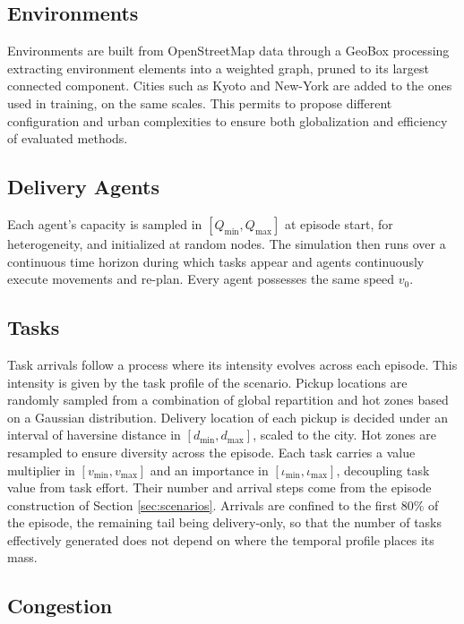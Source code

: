 \documentclass[sigconf]{acmart}
\begin{document}
\subsection{Environments}

Environments are built from OpenStreetMap data through a GeoBox processing extracting environment elements into a weighted graph, pruned to its largest connected component. Cities such as Kyoto and New-York are added to the ones used in training, on the same scales. This permits to propose different configuration and urban complexities to ensure both globalization and efficiency of evaluated methods.

\subsection{Delivery Agents}

Each agent's capacity is sampled in $[Q_{\min}, Q_{\max}]$ at episode start, for heterogeneity, and initialized at random nodes. The simulation then runs over a continuous time horizon during which tasks appear and agents continuously execute movements and re-plan. Every agent possesses the same speed $v_0$.

\subsection{Tasks}

Task arrivals follow a process where its intensity evolves across each episode. This intensity is given by the task profile of the scenario. Pickup locations are randomly sampled from a combination of global repartition and hot zones based on a Gaussian distribution. Delivery location of each pickup is decided under an interval of haversine distance in $[d_{\min}, d_{\max}]$, scaled to the city. Hot zones are resampled to ensure diversity across the episode. Each task carries a value multiplier in $[v_{\min}, v_{\max}]$ and an importance in $[\iota_{\min}, \iota_{\max}]$, decoupling task value from task effort. Their number and arrival steps come from the episode construction of Section \ref{sec:scenarios}. Arrivals are confined to the first $80\%$ of the episode, the remaining tail being delivery-only, so that the number of tasks effectively generated does not depend on where the temporal profile places its mass.

\subsection{Congestion}
\end{document}
